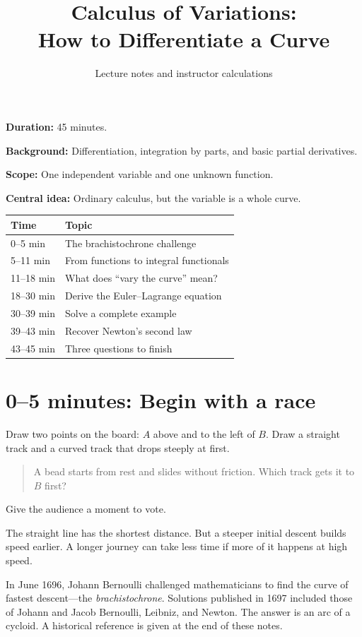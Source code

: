 \documentclass[11pt,a4paper]{article}
\title{Calculus of Variations:\\How to Differentiate a Curve}
\author{Lecture notes and instructor calculations}
\date{}
\begin{document}
\maketitle

\textbf{Duration:} 45 minutes.

\textbf{Background:} Differentiation, integration by parts, and basic
partial derivatives.

\textbf{Scope:} One independent variable and one unknown function.

\textbf{Central idea:}
Ordinary calculus, but the variable is a whole curve.

\begin{center}
\begin{tabular}{@{}ll@{}}
\toprule
Time & Topic \\
\midrule
0--5 min   & The brachistochrone challenge \\
5--11 min  & From functions to integral functionals \\
11--18 min & What does ``vary the curve'' mean? \\
18--30 min & Derive the Euler--Lagrange equation \\
30--39 min & Solve a complete example \\
39--43 min & Recover Newton's second law \\
43--45 min & Three questions to finish \\
\bottomrule
\end{tabular}
\end{center}

\section*{0--5 minutes: Begin with a race}

Draw two points on the board: \(A\) above and to the left of \(B\).
Draw a straight track and a curved track that drops steeply at first.

\begin{quote}
A bead starts from rest and slides without friction.
Which track gets it to \(B\) first?
\end{quote}

Give the audience a moment to vote.

The straight line has the shortest distance. But a steeper initial
descent builds speed earlier. A longer journey can take less time
if more of it happens at high speed.

In June 1696, Johann Bernoulli challenged mathematicians to find the
curve of fastest descent---the \emph{brachistochrone}.
Solutions published in 1697 included those of Johann and Jacob
Bernoulli, Leibniz, and Newton. The answer is an arc of a cycloid.
A historical reference is given at the end of these notes.
\end{document}
